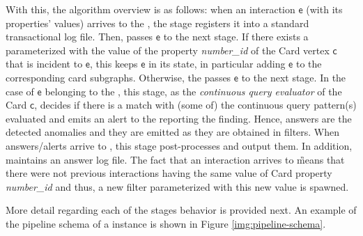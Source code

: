 With this, the \DPATM algorithm overview is as follows: when an interaction $\mathsf{e}$ (with its properties' values) arrives to the \DPATM, the \source stage \Sr registers it into a standard transactional log file. Then, \Sr passes $\mathsf{e}$ to the next stage. If there exists a \filter parameterized with the value of the property \emph{number\_id} of the Card vertex $\mathsf{c}$ that is incident to $\mathsf{e}$, this \filter keeps $\mathsf{e}$ in its state, in particular adding $\mathsf{e}$ to the corresponding card subgraphs. Otherwise, the \filter passes $\mathsf{e}$ to the next stage. In the case of  $\mathsf{e}$ belonging to the \filter, this stage, as the \textit{continuous query evaluator} of the Card $\mathsf{c}$, decides if there is a match with (some of) the continuous query pattern(s) evaluated and emits an alert to the \sink \Sk reporting the finding. Hence, answers are the detected anomalies and they are emitted as they are obtained in filters. When answers/alerts arrive to \Sk, this stage post-processes and output them. In addition, \Sk maintains an answer log file. The fact that an interaction arrives to \G means that there were not previous interactions having the same value of Card property \emph{number\_id} and thus, a new filter parameterized with this new value is spawned. 



More detail regarding each of the stages behavior is provided next. An example of the pipeline schema of a \DPATM instance is shown in Figure \ref{img:pipeline-schema}.

